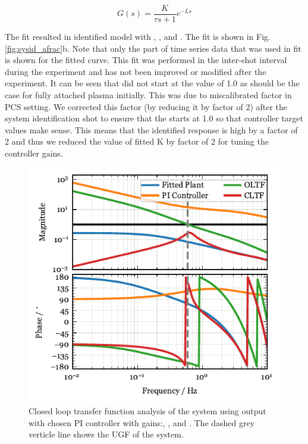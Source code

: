 \begin{equation}
    G(s) = \frac{K}{\tau s + 1}e^{-L s}
\label{eq:sysid}
\end{equation}

The fit resulted in identified model with \AfracK, \AfracTau, and \AfracL.
The fit is shown in Fig.\ref{fig:sysid_afrac}b.
Note that only the part of time series data that was used in fit is shown for the fitted curve.
This fit was performed in the inter-shot interval during the experiment and has not been improved or modified after the experiment.
It can be seen that \Afrac did not start at the value of 1.0 as should be the case for fully attached plasma initially.
This was due to miscalibrated factor in PCS setting.
We corrected this factor (by reducing it by factor of 2) after the system identification shot to ensure that the \Afrac starts at 1.0 so that controller target values make sense.
This means that the identified response is high by a factor of 2 and thus we reduced the value of fitted K by factor of 2 for tuning the controller gains.

\begin{figure}[!ht]
 \centering
 \includegraphics[width=\linewidth]{figures/Afrac_LoopStability.pdf}
 \caption{Closed loop transfer function analysis of the system  using \Afrac output with chosen PI controller with gains:\AfracKp, \AfracTi, and \Afracstau.
The dashed grey verticle line shows the \ac{UGF} of the system.}
\label{fig:cltf_afrac}
\end{figure}


